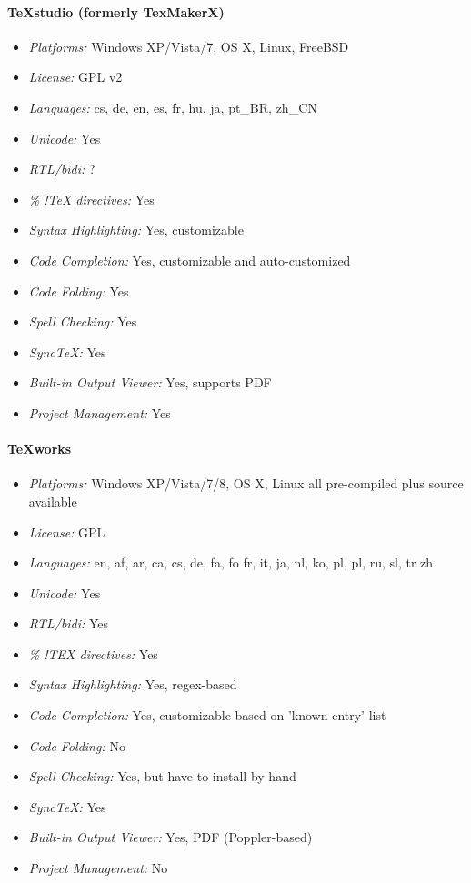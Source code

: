 \paragraph{TeXstudio (formerly TexMakerX)}

\begin{itemize}
    \item \textit{Platforms:} Windows XP/Vista/7, OS X, Linux, FreeBSD
    \item \textit{License:} GPL v2
    \item \textit{Languages:} cs, de, en, es, fr, hu, ja, pt\_BR, zh\_CN
    \item \textit{Unicode:} Yes
    \item \textit{RTL/bidi:} ?
    \item \textit{\% !TeX directives:} Yes
    \item \textit{Syntax Highlighting:} Yes, customizable
    \item \textit{Code Completion:} Yes, customizable and auto-customized
    \item \textit{Code Folding:} Yes
    \item \textit{Spell Checking:} Yes
    \item \textit{SyncTeX:} Yes
    \item \textit{Built-in Output Viewer:} Yes, supports PDF
    \item \textit{Project Management:} Yes
\end{itemize}

\paragraph{TeXworks}

\begin{itemize}
    \item \textit{Platforms:} Windows XP/Vista/7/8, OS X, Linux all pre-compiled plus source available
    \item \textit{License:} GPL
    \item \textit{Languages:} en, af, ar, ca, cs, de, fa, fo fr, it, ja, nl, ko, pl, pl, ru, sl, tr zh
    \item \textit{Unicode:} Yes
    \item \textit{RTL/bidi:} Yes
    \item \textit{\% !TEX directives:} Yes
    \item \textit{Syntax Highlighting:} Yes, regex-based
    \item \textit{Code Completion:} Yes, customizable based on 'known entry' list
    \item \textit{Code Folding:} No
    \item \textit{Spell Checking:} Yes, but have to install by hand
    \item \textit{SyncTeX:} Yes
    \item \textit{Built-in Output Viewer:} Yes, PDF (Poppler-based)
    \item \textit{Project Management:} No
\end{itemize}

